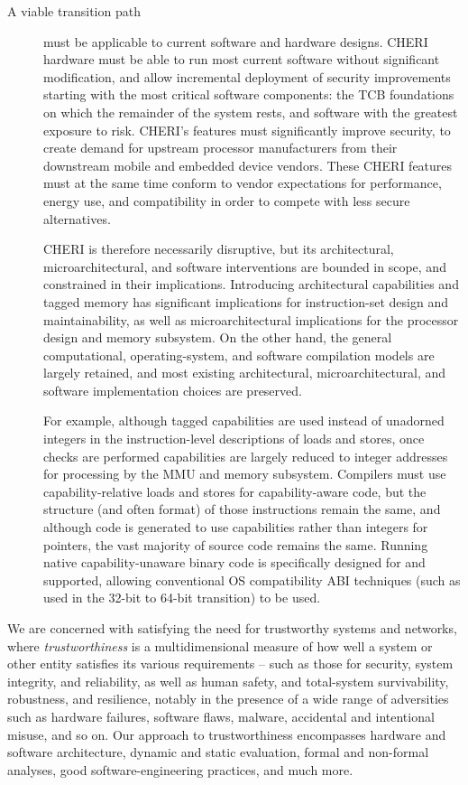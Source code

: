 \begin{description}
\item[A viable transition path] must be applicable to current software and
hardware designs.
CHERI hardware must be able to run most current software without significant
modification, and allow incremental deployment of security
improvements starting with the most critical software components: the TCB
foundations on which the remainder of the system rests, and software with the
greatest exposure to risk.
CHERI's features must significantly improve security, to create demand for
upstream processor manufacturers from their downstream mobile and embedded
device vendors.
These CHERI features must at the same time conform to vendor expectations
for performance, energy use, and compatibility in order to compete with less
secure alternatives.

CHERI is therefore necessarily disruptive, but its architectural,
microarchitectural, and software interventions are bounded in scope, and
constrained in their implications.
Introducing architectural capabilities and tagged memory has significant
implications for instruction-set design and maintainability, as well as
microarchitectural implications for the processor design and memory subsystem.
On the other hand, the general computational, operating-system, and software
compilation models are largely retained, and most existing architectural,
microarchitectural, and software implementation choices are preserved.

For example, although tagged capabilities are used instead of unadorned
integers in the instruction-level descriptions of loads and stores, once
checks are performed capabilities are largely reduced to integer addresses
for processing by the MMU and memory subsystem.
Compilers must use capability-relative loads and stores for capability-aware
code, but the structure (and often format) of those instructions remain the
same, and although code is generated to use capabilities rather than integers
for pointers, the vast majority of source code remains the same.
Running native capability-unaware binary code is specifically designed for and
supported, allowing conventional OS compatibility ABI techniques (such as used
in the 32-bit to 64-bit transition) to be used.

\end{description}

We are concerned with satisfying the need for
trustworthy systems and networks, where {\it
trustworthiness} is a multidimensional measure of how well a system or
other entity satisfies its various requirements -- such as those for
security, system integrity, and reliability, as well as human safety,
and total-system survivability,
robustness, and resilience, notably in the presence of a wide range of
adversities such as hardware failures, software flaws, malware,
accidental and intentional misuse, and so on.  Our approach to
trustworthiness encompasses hardware and software architecture,
dynamic and static evaluation, formal and non-formal analyses, good
software-engineering practices, and much more.

